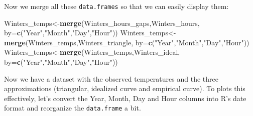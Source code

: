 \documentclass[
]{book}
\newenvironment{Shaded}{\begin{snugshade}}{\end{snugshade}}
\newcommand{\DataTypeTok}[1]{\textcolor[rgb]{0.13,0.29,0.53}{#1}}
\newcommand{\DecValTok}[1]{\textcolor[rgb]{0.00,0.00,0.81}{#1}}
\newcommand{\FloatTok}[1]{\textcolor[rgb]{0.00,0.00,0.81}{#1}}
\newcommand{\KeywordTok}[1]{\textcolor[rgb]{0.13,0.29,0.53}{\textbf{#1}}}
\newcommand{\NormalTok}[1]{#1}
\newcommand{\OperatorTok}[1]{\textcolor[rgb]{0.81,0.36,0.00}{\textbf{#1}}}
\newcommand{\StringTok}[1]{\textcolor[rgb]{0.31,0.60,0.02}{#1}}
\begin{document}
Now we merge all these \texttt{data.frames} so that we can easily display them:

\begin{Shaded}
\begin{Highlighting}[]
\NormalTok{Winters_temps<-}\KeywordTok{merge}\NormalTok{(Winters_hours_gaps,Winters_hours, }\DataTypeTok{by=}\KeywordTok{c}\NormalTok{(}\StringTok{"Year"}\NormalTok{,}\StringTok{"Month"}\NormalTok{,}\StringTok{"Day"}\NormalTok{,}\StringTok{"Hour"}\NormalTok{))}
\NormalTok{Winters_temps<-}\KeywordTok{merge}\NormalTok{(Winters_temps,Winters_triangle, }\DataTypeTok{by=}\KeywordTok{c}\NormalTok{(}\StringTok{"Year"}\NormalTok{,}\StringTok{"Month"}\NormalTok{,}\StringTok{"Day"}\NormalTok{,}\StringTok{"Hour"}\NormalTok{))}
\NormalTok{Winters_temps<-}\KeywordTok{merge}\NormalTok{(Winters_temps,Winters_ideal, }\DataTypeTok{by=}\KeywordTok{c}\NormalTok{(}\StringTok{"Year"}\NormalTok{,}\StringTok{"Month"}\NormalTok{,}\StringTok{"Day"}\NormalTok{,}\StringTok{"Hour"}\NormalTok{))}
\end{Highlighting}
\end{Shaded}

Now we have a dataset with the observed temperatures and the three approximations
(triangular, idealized curve and empirical curve).
To plots this effectively, let's convert the Year, Month, Day and Hour columns into
R's date format and reorganize the \texttt{data.frame} a bit.

\begin{Shaded}
\end{Shaded}
\end{document}
